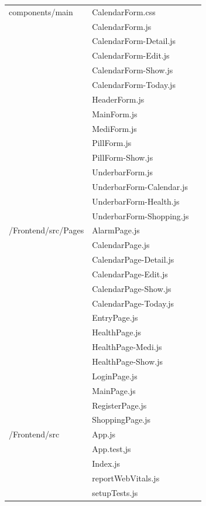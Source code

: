 \documentclass[conference]{IEEEtran}
\begin{document}
\begin{enumerate}
\begin{table}[h!]
\begin{threeparttable}
\begin{tabular}{p{2.4cm}p{2.8cm}p{2cm}}
           components/main & CalendarForm.css \\
            & CalendarForm.js \\
            & CalendarForm-Detail.js \\
            & CalendarForm-Edit.js \\
            & CalendarForm-Show.js \\
            & CalendarForm-Today.js \\ 
            & HeaderForm.js \\
            & MainForm.js \\
            & MediForm.js \\
            & PillForm.js \\
            & PillForm-Show.js \\
            & UnderbarForm.js \\
            & UnderbarForm-Calendar.js \\
            & UnderbarForm-Health.js \\
            & UnderbarForm-Shopping.js\\
            \hline
            /Frontend/src/Pages & AlarmPage.js \\
            & CalendarPage.js \\ 
            & CalendarPage-Detail.js \\ 
            & CalendarPage-Edit.js \\
            & CalendarPage-Show.js \\
            & CalendarPage-Today.js \\
            & EntryPage.js \\
            & HealthPage.js \\
            & HealthPage-Medi.js \\ 
            & HealthPage-Show.js \\
            & LoginPage.js \\
            & MainPage.js \\
            & RegisterPage.js \\
            & ShoppingPage.js\\
            \hline
            /Frontend/src & App.js \\
            & App.test,js \\ 
            & Index.js \\ 
            & reportWebVitals.js \\
            & setupTests.js\\

\end{tabular}
\end{threeparttable}
\end{table}
\end{enumerate}
\end{document}
